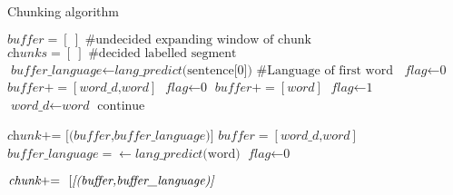 \documentclass[11pt]{article}
\begin{document}
\begin{algorithm}
\caption{Chunking algorithm}\label{euclid}
\begin{algorithmic}[1]
\State $\textit{buffer} = [\ ] \text{\ \ \  \#undecided expanding window of chunk}$
\State $\textit{chunks} = [\ ] \text{\ \ \  \#decided labelled segment}$
\State $\textit{buffer\_language} \gets \textit{lang\_predict}\text{(sentence[0])} \text{\ \ \ \#Language of first word}$
\State $\textit{flag} \gets \text{0}$
        \State $\textit{buffer} += [\textit{word\_d,word}] $
        \State $\textit{flag} \gets \text{0}$
        \Else
        \State $\textit{buffer} += [\textit{word}] $
        \EndIf
        \EndIf
{}
        \State $\textit{flag} \gets \text{1}$
        \State $\textit{word\_d} \gets \textit{word} $
        \State $\text{continue}$

        \Else
        \State $\textit{chunk} \text{+= \ }  \textit{[(buffer,buffer\_language)]} $
        \State $\textit{buffer} = [\textit{word\_d,word}] $
        \State $\textit{buffer\_language} = \gets \textit{lang\_predict}\text{(word)}$%
        \State $\textit{flag} \gets \text{0}$
        \EndIf

\EndIf
\EndFor
{}
        \State $\textit{chunk} \text{+= \ }  \text{[\textit{[(buffer,buffer\_language)]}} $

\EndIf
\end{algorithmic}
\end{algorithm}

\end{document}
